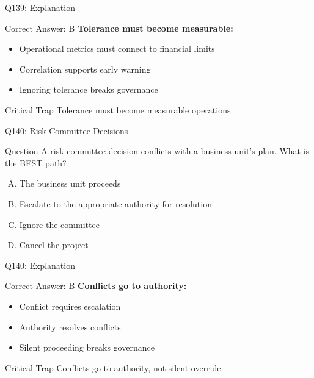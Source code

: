 \documentclass{beamer}
\begin{document}
	\begin{frame}{Q139: Explanation}
		\begin{block}{Correct Answer: B}
			\textbf{Tolerance must become measurable:}
			\begin{itemize}
				\item Operational metrics must connect to financial limits
				\item Correlation supports early warning
				\item Ignoring tolerance breaks governance
			\end{itemize}
		\end{block}
		\begin{alertblock}{Critical Trap}
			Tolerance must become measurable operations.
		\end{alertblock}
	\end{frame}
	
	\begin{frame}{Q140: Risk Committee Decisions}
		\begin{block}{Question}
			A risk committee decision conflicts with a business unit's plan. What is the BEST path?
		\end{block}
		\begin{enumerate}[(A)]
			\item The business unit proceeds
			\item Escalate to the appropriate authority for resolution
			\item Ignore the committee
			\item Cancel the project
		\end{enumerate}
	\end{frame}
	
	\begin{frame}{Q140: Explanation}
		\begin{block}{Correct Answer: B}
			\textbf{Conflicts go to authority:}
			\begin{itemize}
				\item Conflict requires escalation
				\item Authority resolves conflicts
				\item Silent proceeding breaks governance
			\end{itemize}
		\end{block}
		\begin{alertblock}{Critical Trap}
			Conflicts go to authority, not silent override.
		\end{alertblock}
	\end{frame}
	
\end{document}
